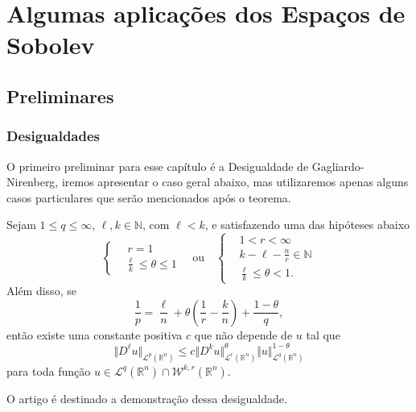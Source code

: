 \documentclass[a4paper, 11pt]{book}
\theoremstyle{definition}
\newcommand{\bN}{\mathbb{N}}
\newcommand{\bR}{\mathbb{R}}
\newcommand{\cL}{\mathcal{L}}
\newcommand{\cW}{\mathcal{W}}
\begin{document}
\chapter{Algumas aplicações dos Espaços de Sobolev}

\section{Preliminares}
\subsection{Desigualdades}

O primeiro preliminar para esse capítulo é a Desigualdade de Gagliardo-Nirenberg, iremos apresentar o caso geral abaixo, mas utilizaremos apenas alguns casos particulares que serão mencionados após o teorema.
\begin{tbox}
    Sejam $1 \leqslant q \leqslant \infty$, $\ell,k \in \bN$, com $\ell < k$, e satisfazendo uma das hipóteses abaixo
    \[
        \left\{ \begin{aligned}
            &\,r = 1\\
            &\frac{\ell}{k} \leqslant \theta \leqslant 1
        \end{aligned} \right.
        \quad
        \text{ou}
        \quad
        \left\{ \begin{aligned}
            &1 < r < \infty\\[4pt]
            &k - \ell - \frac{n}{r} \in \bN\\
            &\frac{\ell}{k} \leqslant \theta < 1.
        \end{aligned} \right.
    \]
    Além disso, se
    \[
        \frac{1}{p} = \frac{\ell}{n} + \theta \left( \frac{1}{r} - \frac{k}{n} \right) + \frac{1 - \theta}{q},
    \]
    então existe uma constante positiva $c$ que não depende de $u$ tal que
    \[
        \Vert D^\ell u \Vert_{\cL^p(\bR^n)} \leqslant c \Vert D^k u \Vert_{\cL^r(\bR^n)}^\theta \Vert u \Vert_{\cL^q(\bR^n)}^{1-\theta}
    \]
    para toda função $u \in \cL^q(\bR^n) \cap \cW^{k,r}(\bR^n)$.  
\end{tbox}
\begin{prf}
    O artigo \cite{fiorenza-gns} é destinado a demonstração dessa desigualdade.
\end{prf}
\end{document}

